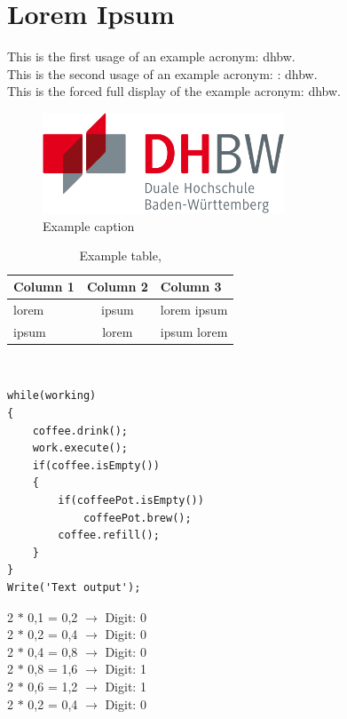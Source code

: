 \chapter{Lorem Ipsum}\label{ch:lorem-ipsum}
This is the first usage of an example acronym: \ac{dhbw}.\\
This is the second usage of an example acronym: : \ac{dhbw}.\\
This is the forced full display of the example acronym: \acf{dhbw}.

\begin{figure}[h]
    \centering
    \includegraphics[height=3cm]{images/dhbw}
    \caption{Example caption}\label{fig:figure}
\end{figure}


\begin{table}[htbp]         %
    \begin{tabular}{lcl}        %
        \hline                  %
        \textbf{Column 1} & \textbf{Column 2} & \textbf{Column 3} \\
        \hline
        lorem             & ipsum             & lorem ipsum       \\
        ipsum             & lorem             & ipsum lorem
    \end{tabular}~\caption{Example table, \cite{lorem}}
    \label{tab:table1}
\end{table}


\begin{lstlisting}[caption=This is a code listing,label=lst:code]
while(working)
{
    coffee.drink();
    work.execute();
    if(coffee.isEmpty())
    {
        if(coffeePot.isEmpty())
            coffeePot.brew();
        coffee.refill();
    }
}
Write('Text output');
\end{lstlisting}


\begin{center}
    2 $\ast$ 0,1 = 0,2 $\rightarrow$ Digit: 0 \\
    2 $\ast$ 0,2 = 0,4 $\rightarrow$ Digit: 0 \\
    2 $\ast$ 0,4 = 0,8 $\rightarrow$ Digit: 0 \\
    2 $\ast$ 0,8 = 1,6 $\rightarrow$ Digit: 1 \\
    2 $\ast$ 0,6 = 1,2 $\rightarrow$ Digit: 1 \\
    2 $\ast$ 0,2 = 0,4 $\rightarrow$ Digit: 0 \\
\end{center}


